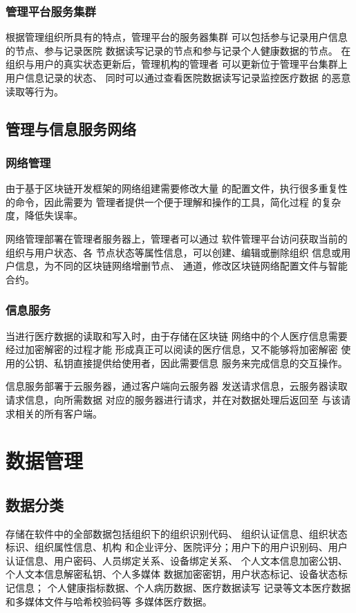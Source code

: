 \documentclass[UTF8]{ctexart}
\begin{document}
    \subsubsection{管理平台服务集群}
    \par
    根据管理组织所具有的特点，管理平台的服务器集群
    可以包括参与记录用户信息的节点、参与记录医院
    数据读写记录的节点和参与记录个人健康数据的节点。
    在组织与用户的真实状态更新后，管理机构的管理者
    可以更新位于管理平台集群上用户信息记录的状态、
    同时可以通过查看医院数据读写记录监控医疗数据
    的恶意读取等行为。
    \subsection{管理与信息服务网络}
    \subsubsection{网络管理}
    \par
    由于基于区块链开发框架的网络组建需要修改大量
    的配置文件，执行很多重复性的命令，因此需要为
    管理者提供一个便于理解和操作的工具，简化过程
    的复杂度，降低失误率。
    \par
    网络管理部署在管理者服务器上，管理者可以通过
    软件管理平台访问获取当前的组织与用户状态、各
    节点状态等属性信息，可以创建、编辑或删除组织
    信息或用户信息，为不同的区块链网络增删节点、
    通道，修改区块链网络配置文件与智能合约。
    \subsubsection{信息服务}
    \par
    当进行医疗数据的读取和写入时，由于存储在区块链
    网络中的个人医疗信息需要经过加密解密的过程才能
    形成真正可以阅读的医疗信息，又不能够将加密解密
    使用的公钥、私钥直接提供给使用者，因此需要信息
    服务来完成信息的交互操作。
    \par
    信息服务部署于云服务器，通过客户端向云服务器
    发送请求信息，云服务器读取请求信息，向所需数据
    对应的服务器进行请求，并在对数据处理后返回至
    与该请求相关的所有客户端。

    \section{数据管理}
    \subsection{数据分类}
    存储在软件中的全部数据包括组织下的组织识别代码、
    组织认证信息、组织状态标识、组织属性信息、机构
    和企业评分、医院评分；用户下的用户识别码、用户
    认证信息、用户密码、人员绑定关系、设备绑定关系、
    个人文本信息加密公钥、个人文本信息解密私钥、个人多媒体
    数据加密密钥，用户状态标记、设备状态标记信息；
    个人健康指标数据、个人病历数据、医疗数据读写
    记录等文本医疗数据和多媒体文件与哈希校验码等
    多媒体医疗数据。
\end{document}
